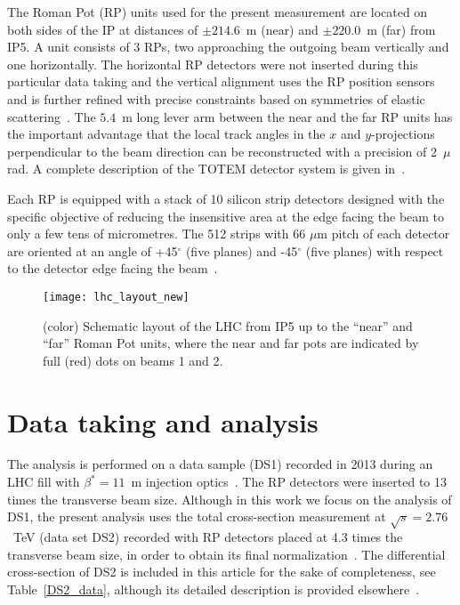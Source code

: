 \documentclass[TOTEM]{cernphprep}
\begin{document}
The Roman Pot (RP) units used for the present measurement are located on both sides of the IP at distances of $\pm214.6$~m (near) and $\pm220.0$~m (far) from IP5. A unit consists of 3 RPs, two approaching the outgoing beam vertically and one horizontally.
The horizontal RP detectors were not inserted during this particular data taking and the vertical alignment uses the RP position sensors and is further refined with precise constraints based on symmetries of elastic scattering~\cite{Nemes:2017gut}.
The $5.4$~m long lever arm between the near and the far RP units has the important advantage that the local track angles in the $x$ and $y$-projections perpendicular to the beam direction can be reconstructed with a precision of 2~$\mu$rad. A complete description of the TOTEM detector
system is given in~\cite{Anelli:2008zza,TOTEM:2013iga}.


			Each RP is equipped with a stack of 10 silicon strip detectors designed with the specific objective of reducing the insensitive area at the edge facing the beam to only a few tens of micrometres. The 512 strips with 66
			$\mu$m pitch of each detector are oriented at an angle of +45$^{\circ}$ (five planes) and -45$^{\circ}$ (five planes) with respect to the
			detector edge facing the beam~\cite{Ruggiero:2009zz}.

	\vspace{1mm}
	\begin{figure}[H]
		\centering
		\texttt{[image: lhc\_layout\_new]}
		\caption{(color) Schematic layout of the LHC from IP5 up to the “near” and “far” Roman Pot units, where the near and far pots are indicated by full (red) dots on beams 1 and 2.}
		\label{layout_LHC}
 	\end{figure}
	\vspace{2mm}


\section{Data taking and analysis}
\label{data_taking}

The analysis is performed on a data sample (DS1) recorded in 2013 during an LHC fill with $\beta^{*}=11$~m injection optics~\cite{Bruning:2004ej,Antchev:2014voa,Nemes:2131667}. The RP detectors
were inserted to 13 times the transverse beam size. Although in this work we focus on the analysis of DS1, the present analysis uses the total cross-section measurement at $\sqrt{s}=2.76$~TeV (data set DS2) recorded with RP detectors placed at 4.3 times the transverse beam size, in order to obtain its final normalization~\cite{Antchev:2017dia}.
The differential cross-section of DS2 is included in this article for the sake of completeness, see Table~\ref{DS2_data}, although its detailed description is provided elsewhere~\cite{Antchev:2017dia,Paper_2p76}.
\end{document}
